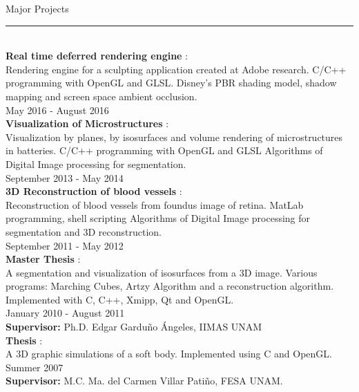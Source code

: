\documentclass[letterpaper,10pt]{article}
\begin{document}
\begin{minipage}{0.4\textwidth} 
\vspace*{-3.0cm}
{\large{Major Projects}} \\
\textcolor{Dandelion}{\rule{0.5\textwidth}{0.05in}} \\

\textbf{Real time deferred rendering engine} : \\
Rendering engine for a sculpting application created at Adobe research.
C/C++ programming with OpenGL and GLSL.
Disney's PBR shading model, shadow mapping and screen space ambient occlusion.\\
May 2016 -  August 2016\\

\textbf{Visualization of Microstructures} : \\
Visualization by planes, by isosurfaces and volume rendering of microstructures in batteries.
C/C++ programming with OpenGL and GLSL
Algorithms of Digital Image processing for segmentation.\\
September 2013 -  May 2014\\

\textbf{3D Reconstruction of blood vessels} : \\
Reconstruction of blood vessels from foundus image of retina.
MatLab programming, shell scripting 
Algorithms of Digital Image processing for segmentation and 3D reconstruction.\\
September 2011 -  May 2012\\

\textbf{Master Thesis} : \\
A segmentation and visualization of isosurfaces from a 3D image. Various programs: Marching Cubes,  Artzy Algorithm and  a reconstruction algorithm. Implemented with C, C++, Xmipp, Qt and OpenGL.\\
January 2010 - August 2011 \\
\textbf{Supervisor:} Ph.D. Edgar Gardu\~{n}o \'{A}ngeles, IIMAS UNAM \\

\textbf{Thesis} : \\
A 3D graphic simulations of a soft body. Implemented using C and OpenGL. \\
Summer 2007 \\
\textbf{Supervisor:} M.C. Ma. del Carmen Villar Pati\~{n}o, FESA UNAM. \\

\vspace*{1.5cm}


\end{minipage}
\end{document}
